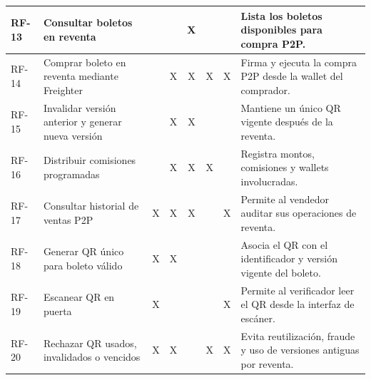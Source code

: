\documentclass[12pt,letterpaper]{article}
\begin{document}
\begin{table}[htbp]
\begin{tabularx}{\textwidth}{|p{1.2cm}|X|c|c|c|c|c|X|}
RF-13 & Consultar boletos en reventa &  &  & X &  &  & Lista los boletos disponibles para compra P2P. \\ \hline
RF-14 & Comprar boleto en reventa mediante Freighter &  & X & X & X & X & Firma y ejecuta la compra P2P desde la wallet del comprador. \\ \hline
RF-15 & Invalidar versión anterior y generar nueva versión &  & X & X &  &  & Mantiene un único QR vigente después de la reventa. \\ \hline
RF-16 & Distribuir comisiones programadas &  & X & X & X &  & Registra montos, comisiones y wallets involucradas. \\ \hline
RF-17 & Consultar historial de ventas P2P & X & X & X &  & X & Permite al vendedor auditar sus operaciones de reventa. \\ \hline
RF-18 & Generar QR único para boleto válido & X & X &  &  &  & Asocia el QR con el identificador y versión vigente del boleto. \\ \hline
RF-19 & Escanear QR en puerta & X &  &  &  & X & Permite al verificador leer el QR desde la interfaz de escáner. \\ \hline
RF-20 & Rechazar QR usados, invalidados o vencidos & X & X &  & X & X & Evita reutilización, fraude y uso de versiones antiguas por reventa. \\ \hline

\end{tabularx}
\normalsize
\end{table}
\end{document}
